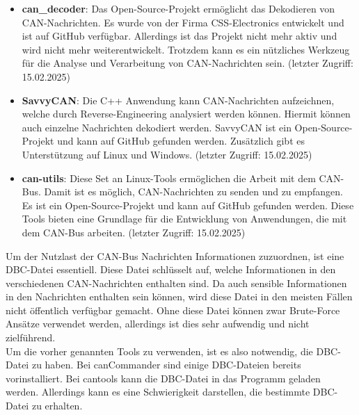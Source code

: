 \begin{itemize}
    \item \textbf{can\_decoder}: Das Open-Source-Projekt ermöglicht das Dekodieren von CAN-Nachrichten. Es wurde von der Firma
    CSS-Electronics entwickelt und ist auf GitHub verfügbar. Allerdings ist das Projekt nicht mehr aktiv und wird nicht mehr
    weiterentwickelt. Trotzdem kann es ein nützliches Werkzeug für die Analyse und Verarbeitung von CAN-Nachrichten sein. 
    \cite{can_decoder} (letzter Zugriff: 15.02.2025)
    \item \textbf{SavvyCAN}: Die C++ Anwendung kann CAN-Nachrichten aufzeichnen, welche durch Reverse-Engineering analysiert werden können.
    Hiermit können auch einzelne Nachrichten dekodiert werden. SavvyCAN ist ein Open-Source-Projekt und kann auf GitHub gefunden werden. Zusätzlich
    gibt es Unterstützung auf Linux und Windows. \cite{SavvyCAN} (letzter Zugriff: 15.02.2025)
    \item \textbf{can-utils}: Diese Set an Linux-Tools ermöglichen die Arbeit mit dem CAN-Bus. Damit ist es möglich, CAN-Nachrichten zu senden und zu empfangen.
    Es ist ein Open-Source-Projekt und kann auf GitHub gefunden werden. Diese Tools bieten eine Grundlage für die Entwicklung von Anwendungen, die mit dem CAN-Bus arbeiten.
    \cite{can-utils} (letzter Zugriff: 15.02.2025)
\end{itemize}
Um der Nutzlast der CAN-Bus Nachrichten Informationen zuzuordnen, ist eine DBC-Datei essentiell. 
Diese Datei schlüsselt auf, welche Informationen in den verschiedenen CAN-Nachrichten enthalten sind.
Da auch sensible Informationen in den Nachrichten enthalten sein können, wird diese Datei in den meisten 
Fällen nicht öffentlich verfügbar gemacht. Ohne diese Datei können zwar Brute-Force Ansätze verwendet werden,
allerdings ist dies sehr aufwendig und nicht zielführend. \cite{Choi2021} \\
Um die vorher genannten Tools zu verwenden, ist es also notwendig, die DBC-Datei zu haben. Bei canCommander
sind einige DBC-Dateien bereits vorinstalliert. Bei cantools kann die DBC-Datei in das Programm geladen werden.
Allerdings kann es eine Schwierigkeit darstellen, die bestimmte DBC-Datei zu erhalten.